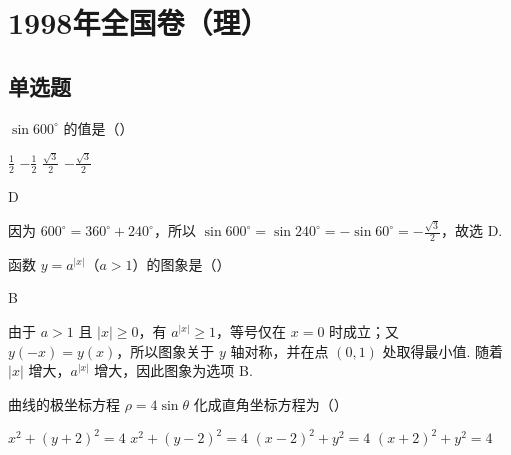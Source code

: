 \documentclass[UTF8,a4paper,oneside,11pt]{ctexbook}
\begin{document}
\mainmatter

\chapter{1998年全国卷（理）}
\section{单选题}

\begin{problem}
\(\sin 600^{\circ}\) 的值是（\quad）

\choices
    {\(\frac{1}{2}\)}
    {\(-\frac{1}{2}\)}
    {\(\frac{\sqrt{3}}{2}\)}
    {\(-\frac{\sqrt{3}}{2}\)}
\end{problem}

\begin{answer}
D
\end{answer}

\begin{solution}
因为 \(600^{\circ}=360^{\circ}+240^{\circ}\)，所以
\(\sin 600^{\circ}=\sin 240^{\circ}=-\sin 60^{\circ}=-\frac{\sqrt{3}}{2}\)，故选 D.
\end{solution}

\begin{problem}
函数 \(y=a^{|x|}\)（\(a>1\)）的图象是（\quad）

\choices
    {}
    {}
    {}
    {}
\end{problem}

\begin{answer}
B
\end{answer}

\begin{solution}
由于 \(a>1\) 且 \(|x|\geq0\)，有 \(a^{|x|}\geq1\)，等号仅在 \(x=0\) 时成立；又 \(y(-x)=y(x)\)，所以图象关于 \(y\) 轴对称，并在点 \((0,1)\) 处取得最小值. 随着 \(|x|\) 增大，\(a^{|x|}\) 增大，因此图象为选项 B.
\end{solution}

\begin{problem}
曲线的极坐标方程 \(\rho = 4\sin \theta \) 化成直角坐标方程为（\quad）

\choices
    {\(x^{2} + (y + 2)^{2} = 4\)}
    {\(x^{2} + (y - 2)^{2} = 4\)}
    {\((x - 2)^{2} + y^{2} = 4\)}
    {\((x + 2)^{2} + y^{2} = 4\)}
\end{problem}
\end{document}
